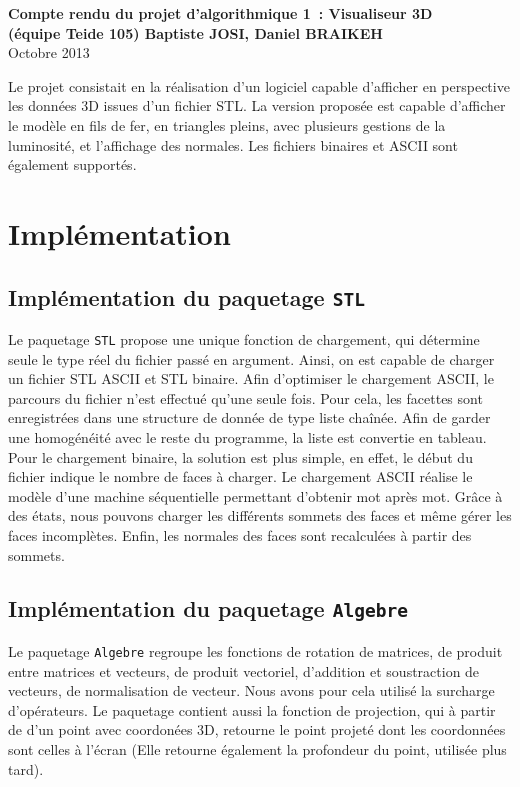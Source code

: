 \documentclass[10pt]{article}
\begin{document}
\begin{center} 
	\textbf{Compte rendu du projet d'algorithmique 1 : Visualiseur 3D} \\
	\textbf{(équipe Teide 105) Baptiste JOSI, Daniel BRAIKEH} \\
	Octobre 2013
\end{center}


Le projet consistait en la réalisation d'un logiciel capable d'afficher en perspective les données 3D issues d'un fichier STL.
La version proposée est capable d'afficher le modèle en fils de fer, en triangles pleins, avec plusieurs gestions de la luminosité, et l'affichage des normales. Les fichiers binaires et ASCII sont également supportés.


\section{Implémentation}

\subsection{Implémentation du paquetage {\tt STL}}
Le paquetage {\tt STL} propose une unique fonction de chargement, qui détermine seule le type réel du fichier passé en argument. Ainsi, on est capable de charger un fichier STL ASCII et STL binaire. Afin d'optimiser le chargement ASCII, le parcours du fichier n'est effectué qu'une seule fois. Pour cela, les facettes sont enregistrées dans une structure de donnée de type liste chaînée. Afin de garder une homogénéité avec le reste du programme, la liste est convertie en tableau. Pour le chargement binaire, la solution est plus simple, en effet, le début du fichier indique le nombre de faces à charger.
Le chargement ASCII réalise le modèle d'une machine séquentielle permettant d'obtenir mot après mot. Grâce à des états, nous pouvons charger les différents sommets des faces et même gérer les faces incomplètes. Enfin, les normales des faces sont recalculées à partir des sommets.

\subsection{Implémentation du paquetage {\tt Algebre}}
Le paquetage {\tt Algebre} regroupe les fonctions de rotation de matrices, de produit entre matrices et vecteurs, de produit vectoriel, d'addition et soustraction de vecteurs, de normalisation de vecteur. Nous avons pour cela utilisé la surcharge d'opérateurs.
Le paquetage contient aussi la fonction de projection, qui à partir de d'un point avec coordonées 3D, retourne le point projeté dont les coordonnées sont celles à l'écran (Elle retourne également la profondeur du point, utilisée plus tard).
\end{document}
